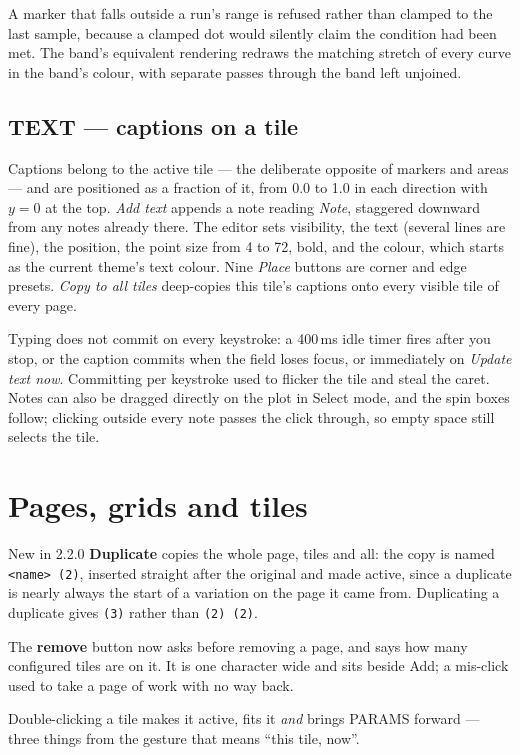 \documentclass[11pt,a4paper,oneside]{report}
\newcommand{\code}[1]{\texttt{#1}}
\begin{document}
A marker that falls outside a run's range is refused rather than clamped to the
last sample, because a clamped dot would silently claim the condition had been
met. The band's equivalent rendering redraws the matching stretch of every curve
in the band's colour, with separate passes through the band left unjoined.

\section{TEXT --- captions on a tile}

Captions belong to the active tile --- the deliberate opposite of markers and
areas --- and are positioned as a fraction of it, from 0.0 to 1.0 in each
direction with $y = 0$ at the top. \emph{Add text} appends a note reading
\emph{Note}, staggered downward from any notes already there. The editor sets
visibility, the text (several lines are fine), the position, the point size from
4 to 72, bold, and the colour, which starts as the current theme's text colour.
Nine \emph{Place} buttons are corner and edge presets. \emph{Copy to all tiles}
deep-copies this tile's captions onto every visible tile of every page.

Typing does not commit on every keystroke: a 400\,ms idle timer fires after you
stop, or the caption commits when the field loses focus, or immediately on
\emph{Update text now}. Committing per keystroke used to flicker the tile and
steal the caret. Notes can also be dragged directly on the plot in Select mode,
and the spin boxes follow; clicking outside every note passes the click through,
so empty space still selects the tile.

\chapter{Pages, grids and tiles}

\begin{aoenew}{New in 2.2.0}
\textbf{Duplicate} copies the whole page, tiles and all: the copy is named
\code{<name> (2)}, inserted straight after the original and made active, since
a duplicate is nearly always the start of a variation on the page it came from.
Duplicating a duplicate gives \code{(3)} rather than \code{(2) (2)}.

The \textbf{remove} button now asks before removing a page, and says how many
configured tiles
are on it. It is one character wide and sits beside Add; a mis-click used to
take a page of work with no way back.

Double-clicking a tile makes it active, fits it \emph{and} brings PARAMS
forward --- three things from the gesture that means ``this tile, now''.
\end{aoenew}
\label{ch:pages}
\end{document}
